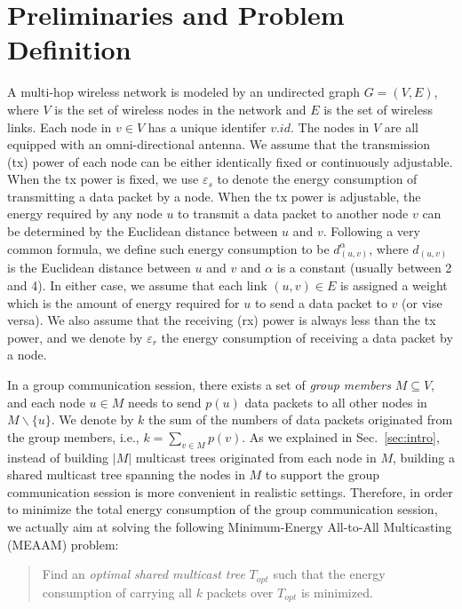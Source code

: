 \documentclass[10pt, conference, compsocconf]{IEEEtran}
\begin{document}
\section{Preliminaries and Problem Definition} \label{sec:model}
A  multi-hop wireless network is modeled by an undirected graph $G=(V,E)$, where $V$ is the set of wireless nodes in the network and $E$ is the set of wireless links. Each node in $v \in V$ has a unique identifer $v.\mathit{id}$. The nodes in $V$ are
all equipped with an omni-directional antenna. We assume that the transmission (tx) power of each node can be either identically fixed or continuously adjustable. When the tx power is fixed, we use $\varepsilon_s$ to denote the energy consumption of transmitting a data packet by a node. When the tx power is adjustable, the energy required by any node $u$ to transmit a data packet to another node $v$ can be determined by the Euclidean distance between $u$ and $v$. Following a very common formula, we define such energy consumption to be $d_{(u,v)}^\alpha$, where $d_{(u,v)}$ is the Euclidean distance between $u$ and $v$ and $\alpha$ is a constant (usually between 2 and 4). In either case, we assume that each link $(u,v)\in E$ is assigned a weight which is the amount of energy required for $u$ to send a data packet to $v$ (or vise versa). We also assume that the receiving (rx) power is always less than the tx power, and we denote by $\varepsilon_r$ the energy consumption of receiving a data packet by a node.

  In a group communication session, there exists a set of \textit{group members} $M\subseteq V$, and each node $u \in M$ needs to send $p(u)$ data packets to all other nodes in $M\backslash \{u\}$. We denote by $k$ the sum of the numbers of data packets originated from the group members, i.e., $k = \sum\nolimits_{v \in M} {p(v)}$. As we explained in Sec.~\ref{sec:intro}, instead of building $|M|$ multicast trees originated from each node in $M$, building a shared multicast tree spanning the nodes in $M$ to support the group communication session is more convenient in realistic settings. Therefore, in order to minimize the total energy consumption of the group communication session, we actually aim at solving the following Minimum-Energy All-to-All Multicasting (MEAAM) problem:
\begin{quote}
    Find an \textit{optimal shared multicast tree} $T_{\mathit{opt}}$ such that the energy consumption of carrying all $k$ packets over $T_{\mathit{opt}}$ is minimized.
  \end{quote}
\end{document}
